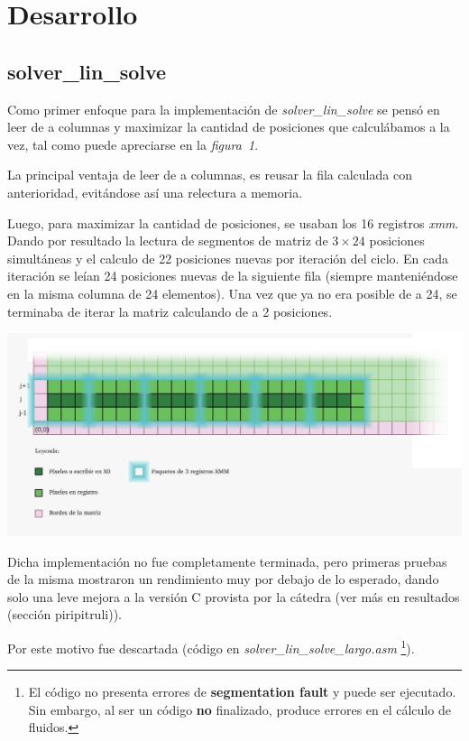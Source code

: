 \section{Desarrollo}

\subsection{solver_lin_solve}

Como primer enfoque para la implementación de {\it solver_lin_solve\/} se pensó en
leer de a columnas y maximizar la cantidad de posiciones que calculábamos a
la vez, tal como puede apreciarse en la \hbox{\it figura 1\/}.

La principal ventaja de leer de a columnas, es reusar la fila calculada con
anterioridad, evitándose así una relectura a memoria.

Luego, para maximizar la cantidad de posiciones, se usaban los 16 registros {\it
  xmm\/}.
Dando por resultado la lectura de segmentos de matriz de $3\times24$
posiciones simultáneas y el calculo de 22 posiciones nuevas por iteración del
ciclo. En cada iteración se leían 24 posiciones nuevas de la siguiente fila
(siempre manteniéndose en la misma columna de 24 elementos).
Una vez que ya no era posible de a 24, se terminaba de iterar la matriz
calculando de a 2 posiciones.

\includegraphics[width=\textwidth]{imagenes/24.jpeg}

Dicha implementación no fue completamente terminada, pero primeras
pruebas de la misma mostraron un rendimiento muy por debajo de lo esperado,
dando solo una leve mejora a la versión C provista por la cátedra (ver más en
resultados (sección piripitruli)).

Por este motivo fue descartada (código en {\it solver_lin_solve_largo.asm\/}
\footnote{El código no presenta errores de {\bf segmentation fault} y puede ser
  ejecutado. Sin embargo, al ser un código {\bf no} finalizado, produce errores
  en el cálculo de fluidos.}).

